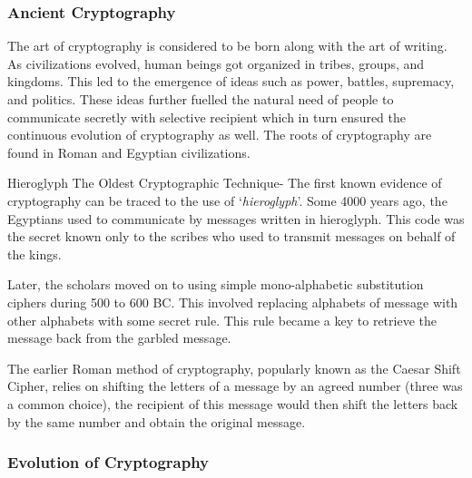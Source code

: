 \documentclass[british]{article}
\begin{document}
\subsubsection{Ancient Cryptography}

The art of cryptography is considered to be born along with the art
of writing. As civilizations evolved, human beings got organized in
tribes, groups, and kingdoms. This led to the emergence of ideas such
as power, battles, supremacy, and politics. These ideas further fuelled
the natural need of people to communicate secretly with selective
recipient which in turn ensured the continuous evolution of cryptography
as well. The roots of cryptography are found in Roman and Egyptian
civilizations.

Hieroglyph \textminus{} The Oldest Cryptographic Technique- The first
known evidence of cryptography can be traced to the use of `\textit{hieroglyph}'.
Some 4000 years ago, the Egyptians used to communicate by messages
written in hieroglyph. This code was the secret known only to the
scribes who used to transmit messages on behalf of the kings.

Later, the scholars moved on to using simple mono-alphabetic substitution
ciphers during 500 to 600 BC. This involved replacing alphabets of
message with other alphabets with some secret rule. This rule became
a key to retrieve the message back from the garbled message.

The earlier Roman method of cryptography, popularly known as the Caesar
Shift Cipher, relies on shifting the letters of a message by an agreed
number (three was a common choice), the recipient of this message
would then shift the letters back by the same number and obtain the
original message.

\subsubsection{Evolution of Cryptography}
\end{document}
